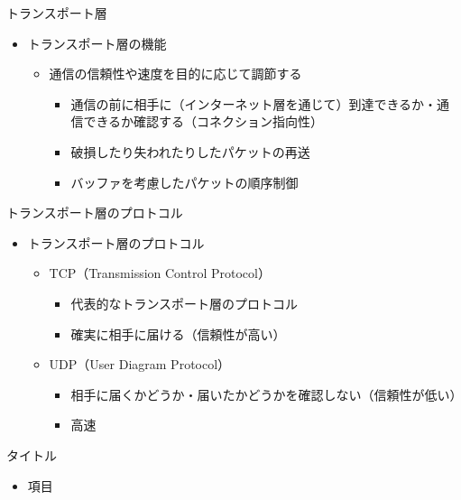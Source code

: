 \documentclass[12pt,aspectratio=169]{beamer}
\begin{document}
\begin{frame}{トランスポート層}

  \begin{itemize}
    \item トランスポート層の機能
      \begin{itemize}
        \item 通信の信頼性や速度を目的に応じて調節する
          \begin{itemize}
            \item 通信の前に相手に（インターネット層を通じて）到達できるか・通信できるか確認する（コネクション指向性）
            \item 破損したり失われたりしたパケットの再送
            \item バッファを考慮したパケットの順序制御
          \end{itemize}

      \end{itemize}

  \end{itemize}

\end{frame}


\begin{frame}{トランスポート層のプロトコル}

  \begin{itemize}
    \item トランスポート層のプロトコル
      \begin{itemize}
        \item TCP（Transmission Control Protocol）
          \begin{itemize}
            \item 代表的なトランスポート層のプロトコル
            \item 確実に相手に届ける（信頼性が高い）
          \end{itemize}

        \item UDP（User Diagram Protocol）
          \begin{itemize}
            \item 相手に届くかどうか・届いたかどうかを確認しない（信頼性が低い）
            \item 高速
          \end{itemize}

      \end{itemize}
  \end{itemize}

\end{frame}


\begin{frame}{タイトル}

  \begin{itemize}
    \item 項目

  \end{itemize}

\end{frame}
\end{document}
